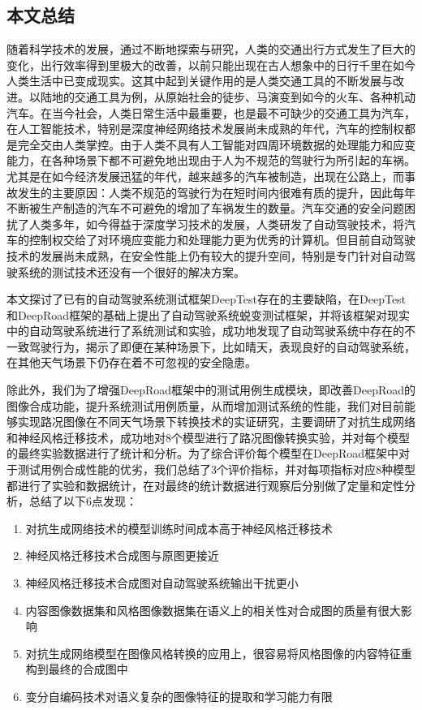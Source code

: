 \begin{conclusions}
 
\subsection{本文总结}

随着科学技术的发展，通过不断地探索与研究，人类的交通出行方式发生了巨大的变化，出行效率得到里极大的改善，以前只能出现在古人想象中的日行千里在如今人类生活中已变成现实。这其中起到关键作用的是人类交通工具的不断发展与改进。以陆地的交通工具为例，从原始社会的徒步、马演变到如今的火车、各种机动汽车。在当今社会，人类日常生活中最重要，也是最不可缺少的交通工具为汽车，在人工智能技术，特别是深度神经网络技术发展尚未成熟的年代，汽车的控制权都是完全交由人类掌控。由于人类不具有人工智能对四周环境数据的处理能力和应变能力，在各种场景下都不可避免地出现由于人为不规范的驾驶行为所引起的车祸。尤其是在如今经济发展迅猛的年代，越来越多的汽车被制造，出现在公路上，而事故发生的主要原因：人类不规范的驾驶行为在短时间内很难有质的提升，因此每年不断被生产制造的汽车不可避免的增加了车祸发生的数量。汽车交通的安全问题困扰了人类多年，如今得益于深度学习技术的发展，人类研发了自动驾驶技术，将汽车的控制权交给了对环境应变能力和处理能力更为优秀的计算机。但目前自动驾驶技术的发展尚未成熟，在安全性能上仍有较大的提升空间，特别是专门针对自动驾驶系统的测试技术还没有一个很好的解决方案。

本文探讨了已有的自动驾驶系统测试框架DeepTest存在的主要缺陷，在DeepTest和DeepRoad框架的基础上提出了自动驾驶系统蜕变测试框架，并将该框架对现实中的自动驾驶系统进行了系统测试和实验，成功地发现了自动驾驶系统中存在的不一致驾驶行为，揭示了即便在某种场景下，比如晴天，表现良好的自动驾驶系统，在其他天气场景下仍存在着不可忽视的安全隐患。

除此外，我们为了增强DeepRoad框架中的测试用例生成模块，即改善DeepRoad的图像合成功能，提升系统测试用例质量，从而增加测试系统的性能，我们对目前能够实现路况图像在不同天气场景下转换技术的实证研究，主要调研了对抗生成网络和神经风格迁移技术，成功地对8个模型进行了路况图像转换实验，并对每个模型的最终实验数据进行了统计和分析。为了综合评价每个模型在DeepRoad框架中对于测试用例合成性能的优劣，我们总结了3个评价指标，并对每项指标对应8种模型都进行了实验和数据统计，在对最终的统计数据进行观察后分别做了定量和定性分析，总结了以下6点发现：
\begin{enumerate}
    \item 对抗生成网络技术的模型训练时间成本高于神经风格迁移技术
    \item 神经风格迁移技术合成图与原图更接近
    \item 神经风格迁移技术合成图对自动驾驶系统输出干扰更小
    \item 内容图像数据集和风格图像数据集在语义上的相关性对合成图的质量有很大影响
    \item 对抗生成网络模型在图像风格转换的应用上，很容易将风格图像的内容特征重构到最终的合成图中
    \item 变分自编码技术对语义复杂的图像特征的提取和学习能力有限
\end{enumerate}


\end{conclusions}
